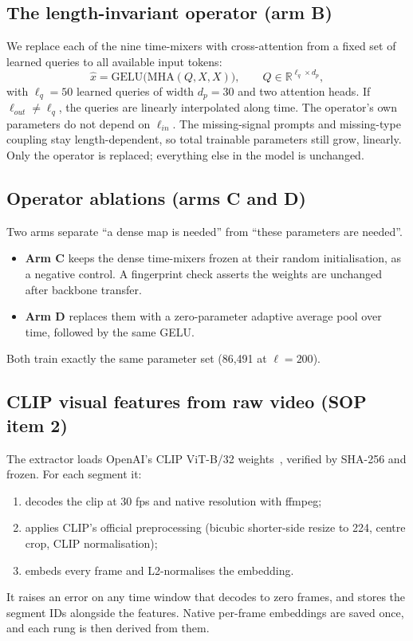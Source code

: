 \documentclass[lettersize,journal]{IEEEtran}
\begin{document}
\subsection{The length-invariant operator (arm B)}
We replace each of the nine time-mixers with cross-attention from a fixed set of learned queries to all available input tokens:
\begin{equation}
\hat{x} = \mathrm{GELU}\big(\mathrm{MHA}(Q, X, X)\big),\qquad Q\in\mathbb{R}^{\ell_q\times d_p},
\end{equation}
with $\ell_q=50$ learned queries of width $d_p=30$ and two attention heads. If $\ell_{out}\neq\ell_q$, the queries are linearly interpolated along time. The operator's own parameters do not depend on $\ell_{in}$. The missing-signal prompts and missing-type coupling stay length-dependent, so total trainable parameters still grow, linearly. Only the operator is replaced; everything else in the model is unchanged.

\subsection{Operator ablations (arms C and D)}
Two arms separate ``a dense map is needed'' from ``these parameters are needed''.
\begin{itemize}
\item \textbf{Arm C} keeps the dense time-mixers frozen at their random initialisation, as a negative control. A fingerprint check asserts the weights are unchanged after backbone transfer.
\item \textbf{Arm D} replaces them with a zero-parameter adaptive average pool over time, followed by the same GELU.
\end{itemize}
Both train exactly the same parameter set (86,491 at $\ell=200$).

\subsection{CLIP visual features from raw video (SOP item 2)}
The extractor loads OpenAI's CLIP ViT-B/32 weights~\cite{radford2021clip}, verified by SHA-256 and frozen. For each segment it:
\begin{enumerate}
\item decodes the clip at 30 fps and native resolution with ffmpeg;
\item applies CLIP's official preprocessing (bicubic shorter-side resize to 224, centre crop, CLIP normalisation);
\item embeds every frame and L2-normalises the embedding.
\end{enumerate}
It raises an error on any time window that decodes to zero frames, and stores the segment IDs alongside the features. Native per-frame embeddings are saved once, and each rung is then derived from them.
\end{document}
